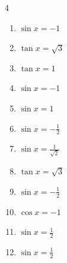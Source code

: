 \begin{multicols}{4}
\begin{enumerate}

  \item $\displaystyle \sin{x}  = -1$


  \item $\displaystyle \tan{x}  = \sqrt{3}$


  \item $\displaystyle \tan{x}  = 1$


  \item $\displaystyle \sin{x}  = -1$


  \item $\displaystyle \sin{x}  = 1$


  \item $\displaystyle \sin{x}  = -\frac{1}{2}$


  \item $\displaystyle \sin{x}  = \frac{1}{\sqrt{2}}$


  \item $\displaystyle \tan{x}  = \sqrt{3}$


  \item $\displaystyle \sin{x}  = -\frac{1}{2}$


  \item $\displaystyle \cos{x}  = -1$


  \item $\displaystyle \sin{x}  = \frac{1}{2}$


  \item $\displaystyle \sin{x}  = \frac{1}{2}$


\end{enumerate}
\end{multicols}
